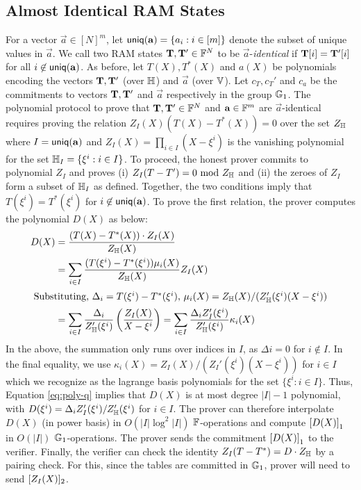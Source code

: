 \subsection{Almost Identical RAM States}\label{subsec:proximity-ram}
For a vector $\vec{a}\in [N]^m$, let $\mathsf{uniq}(\mathbf{{a}})=\{a_i: i\in [m]\}$ denote the subset of unique values in $\vec{a}$. We call two
RAM states $\mathbf{T}, \mathbf{T}'\in \mathbb{F}^N$ to be $\vec{a}$-{\em identical} if $\mathbf{T}[i]=\mathbf{T}'[i]$ for all $i\not\in\mathsf{uniq}(\mathbf{{a}})$. As before,
let $T(X),T^*(X)$ and $a(X)$ be polynomials encoding the vectors $\mathbf{T},\mathbf{T}'$ (over $\mathbb{H}$) and $\vec{a}$ (over $\mathbb{V}$). Let
$c_T, c_T'$ and $c_a$ be the commitments to vectors $\mathbf{T}, \mathbf{T}'$ and $\vec{a}$ respectively in the group $\mathbb{G}_1$. The polynomial protocol to prove that
$\mathbf{T},\mathbf{T}'\in \mathbb{F}^N$ and $\mathbf{a}\in \mathbb{F}^m$ are $\vec{a}$-identical requires proving the relation
$Z_I(X)(T(X) - T^*(X)) = 0$ over the set $Z_{\mathbb{H}}$ where
$I=\mathsf{uniq}(\mathbf{{a}})$ and $Z_I(X)=\prod_{i\in I}(X-\xi^i)$ is the vanishing polynomial for the set $\mathbb{H}_I=\{\xi^i: i\in I\}$.
To proceed, the honest prover commits to polynomial $Z_I$ and proves (i) $Z_I(T - T') = 0 \text{ mod } Z_{\mathbb{H}}$ and (ii) the zeroes
of $Z_I$ form a subset of $\mathbb{H}_I$ as defined. Together, the two conditions imply that $T(\xi^i)=T^*(\xi^i)$ for $i\not\in \mathsf{uniq}(\mathbf{{a}})$.
To prove the first relation, the prover computes the polynomial $D(X)$ as below:
\begin{align}\label{eq:poly-q}
D(X) &= \frac{(T(X)-T^*(X))\cdot Z_I(X)}{Z_{\mathbb{H}}(X)} \nonumber \\
&= \sum_{i\in I}\frac{(T(\xi^i) - T^*(\xi^i))\mu_i(X)}{Z_{\mathbb{H}}(X)} Z_I(X) \nonumber \\
\intertext{ Substituting, $\Delta_i=T(\xi^i) - T^*(\xi^i)$, $\mu_i(X)=Z_\mathbb{H}(X)/(Z_\mathbb{H}'(\xi^i)(X-\xi^i))$ }
&=\sum_{i\in I}\frac{\Delta_i}{Z_{\mathbb{H}}'(\xi^i)}\left(\frac{Z_I(X)}{X-\xi^i}\right) = \sum_{i\in I}\frac{\Delta_i Z_I'(\xi^i)}{Z_{\mathbb{H}}'(\xi^i)}\kappa_i(X)
\end{align}
In the above, the summation only runs over indices in $I$, as $\Delta i = 0$ for $i\not\in I$. In the final equality, we use
$\kappa_i(X) = Z_I(X)/(Z_I'(\xi^i)(X-\xi^i))$ for $i\in I$ which we recognize as the lagrange basis polynomials for the set
$\{\xi^i: i\in I\}$. Thus, Equation \eqref{eq:poly-q} implies that $D(X)$ is at most degree $|I|-1$ polynomial, with
$D(\xi^i)=\Delta_i Z_I'(\xi^i)/Z_\mathbb{H}'(\xi^i)$ for $i\in I$.
The prover can therefore interpolate $D(X)$ (in power basis)
in $O(|I|\log^2 |I|)$ $\mathbb{F}$-operations and compute $\left[{D(X)}\right]_1$ in $O(|I|)$ $\mathbb{G}_1$-operations. The prover sends the
commitment $\left[{D(X)}\right]_1$ to the verifier. Finally, the verifier can
check the identity $Z_I(T - T^*) = D\cdot Z_{\mathbb{H}}$  by a pairing check. For this, since the tables are committed in $\mathbb{G}_1$, prover will need to send $[Z_I(X)]_2$.


